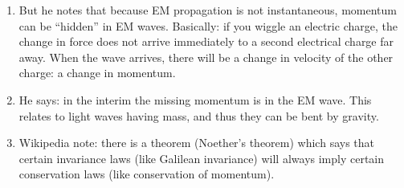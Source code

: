 \begin{enumerate}
  \item But he notes that because EM propagation is not instantaneous,
  momentum can be ``hidden'' in EM waves. Basically: if you wiggle an
  electric charge, the change in force does not arrive immediately to a
  second electrical charge far away. When the wave arrives, there will
  be a change in velocity of the other charge: a change in momentum.

  \item He says: in the interim the missing momentum is in the EM wave.
  This relates to light waves having mass, and thus they can be bent by
  gravity.

  \item Wikipedia note: there is a theorem (Noether's theorem) which
  says that certain invariance laws (like Galilean invariance) will
  always imply certain conservation laws (like conservation of
  momentum).

\end{enumerate}
